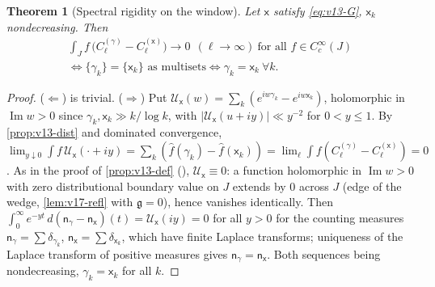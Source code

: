 \documentclass[11pt,a4paper]{article}
\numberwithin{equation}{section}
\newtheorem{theorem}{Theorem}[section]
\theoremstyle{definition}
\theoremstyle{remark}
\begin{document}
\begin{theorem}[Spectral rigidity on the window]\label{prop:v13-rig}
Let $\mathsf x$ satisfy \eqref{eq:v13-G}, $\mathsf x_k$ nondecreasing. Then
\begin{equation}
\begin{gathered}
\int_Jf\,\bigl(C_\ell^{(\gamma)}-C_\ell^{(\mathsf x)}\bigr)\to0\ \ (\ell\to\infty)\ \text{for all }f\in C_c^\infty(J)\\
\iff \{\gamma_k\}=\{\mathsf x_k\}\text{ as multisets}\iff\gamma_k=\mathsf x_k\ \forall k .
\end{gathered}
\end{equation}
\end{theorem}
\begin{proof}
($\Leftarrow$) is trivial. ($\Rightarrow$) Put $\mathscr U_{\mathsf x}(w)=\sum_k(e^{iw\gamma_k}-e^{iw\mathsf x_k})$, holomorphic in $\operatorname{Im}w>0$ since $\gamma_k,\mathsf x_k\gg k/\log k$, with $|\mathscr U_{\mathsf x}(u+iy)|\ll y^{-2}$ for $0<y\le1$. By \cref{prop:v13-dist} and dominated convergence, $\lim_{y\downarrow0}\int f\,\mathscr U_{\mathsf x}(\cdot+iy)=\sum_k(\hat f(\gamma_k)-\hat f(\mathsf x_k))=\lim_\ell\int f(C^{(\gamma)}_\ell-C^{(\mathsf x)}_\ell)=0$. As in the proof of \cref{prop:v13-def} (\cite[Lemma~5.4]{CasanaV26}), $\mathscr U_{\mathsf x}\equiv0$: a function holomorphic in $\operatorname{Im}w>0$ with zero distributional boundary value on $J$ extends by $0$ across $J$ (edge of the wedge, \cref{lem:v17-refl} with $\mathfrak g=0$), hence vanishes identically. Then $\int_0^\infty e^{-yt}\,d(\mathsf n_\gamma-\mathsf n_{\mathsf x})(t)=\mathscr U_{\mathsf x}(iy)=0$ for all $y>0$ for the counting measures $\mathsf n_\gamma=\sum\delta_{\gamma_k}$, $\mathsf n_{\mathsf x}=\sum\delta_{\mathsf x_k}$, which have finite Laplace transforms; uniqueness of the Laplace transform of positive measures gives $\mathsf n_\gamma=\mathsf n_{\mathsf x}$. Both sequences being nondecreasing, $\gamma_k=\mathsf x_k$ for all $k$.
\end{proof}
\end{document}
